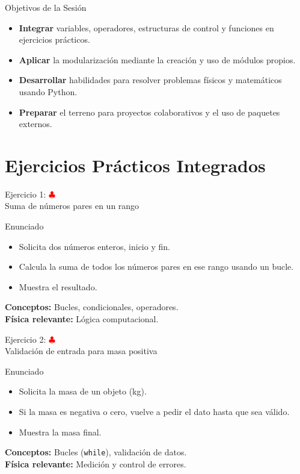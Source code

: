 \documentclass[10pt]{beamer}
\begin{document}
\begin{frame}{Objetivos de la Sesión}
  \begin{itemize}
    \item \textbf{Integrar} variables, operadores, estructuras de control y funciones en ejercicios prácticos.
    \item \textbf{Aplicar} la modularización mediante la creación y uso de módulos propios.
    \item \textbf{Desarrollar} habilidades para resolver problemas físicos y matemáticos usando Python.
    \item \textbf{Preparar} el terreno para proyectos colaborativos y el uso de paquetes externos.
  \end{itemize}
\end{frame}


\section{Ejercicios Prácticos Integrados}


\begin{frame}{Ejercicio 1: \hfill \textcolor{red}{$\clubsuit$} \\ Suma de números pares en un rango}
  \begin{block}{Enunciado}
    \begin{itemize}
      \item Solicita dos números enteros, inicio y fin.
      \item Calcula la suma de todos los números pares en ese rango usando un bucle.
      \item Muestra el resultado.
    \end{itemize}
  \end{block}
  \textbf{Conceptos:} Bucles, condicionales, operadores.\\
  \textbf{Física relevante:} Lógica computacional.
\end{frame}

\begin{frame}{Ejercicio 2: \hfill \textcolor{red}{$\clubsuit$} \\ Validación de entrada para masa positiva}
  \begin{block}{Enunciado}
    \begin{itemize}
      \item Solicita la masa de un objeto (kg).
      \item Si la masa es negativa o cero, vuelve a pedir el dato hasta que sea válido.
      \item Muestra la masa final.
    \end{itemize}
  \end{block}
  \textbf{Conceptos:} Bucles (\texttt{while}), validación de datos.\\
  \textbf{Física relevante:} Medición y control de errores.
\end{frame}
\end{document}
